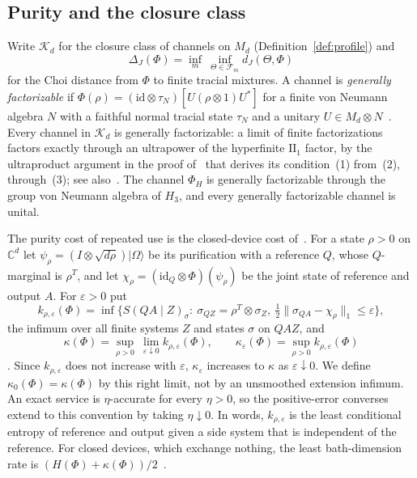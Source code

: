 \documentclass[11pt,a4paper]{article}
\theoremstyle{plain}
\theoremstyle{definition}
\theoremstyle{remark}
\newcommand{\dJ}{d_J}
\begin{document}
\subsection{Purity and the closure class}\label{sec:res-purity}


Write $\mathcal K_d$ for the closure class of channels on $M_d$ (Definition~\ref{def:profile}) and
\[
\Delta_J(\Phi)=\inf_m\ \inf_{\Theta\in\mathcal F_m}\dJ(\Theta,\Phi)
\]
for the Choi distance from $\Phi$ to finite tracial mixtures. A channel is \emph{generally factorizable} if
$\Phi(\rho)=(\mathrm{id}\otimes\tau_N)[U(\rho\otimes1)U^*]$ for a finite von Neumann algebra $N$ with a faithful normal tracial state
$\tau_N$ and a unitary $U\in M_d\otimes N$~\cite{AD2006,HaagerupMusat2011}. Every channel in $\mathcal K_d$ is generally
factorizable: a limit of finite factorizations factors exactly through an ultrapower of the hyperfinite $\mathrm{II}_1$ factor, by the
ultraproduct argument in the proof of~\cite[Theorem~3.6]{HaagerupMusat2015} that derives its condition~(1) from~(2), through~(3); see
also~\cite[Section~3]{Musat2025}. The channel $\Phi_H$ is generally factorizable through the group von Neumann algebra of $H_3$, and
every generally factorizable channel is unital.

The purity cost of repeated use is the closed-device cost of~\cite{Douglas2026closed}. For a state $\rho>0$ on $\mathbb C^d$ let
$\psi_\rho=(I\otimes\sqrt{d\rho})|\Omega\rangle$ be its purification with a reference $Q$, whose $Q$-marginal is $\rho^T$, and let
$\chi_\rho=(\mathrm{id}_Q\otimes\Phi)(\psi_\rho)$ be the joint state of reference and output $A$. For $\varepsilon>0$ put
\begin{equation}\label{eq:kappa-def}
k_{\rho,\varepsilon}(\Phi)=\inf\Big\{S(QA\mid Z)_\sigma:\ \sigma_{QZ}=\rho^T\otimes\sigma_Z,\ \tfrac12\|\sigma_{QA}-\chi_\rho\|_1\le\varepsilon\Big\},
\end{equation}
the infimum over all finite systems $Z$ and states $\sigma$ on $QAZ$, and
\[
\kappa(\Phi)=\sup_{\rho>0}\ \lim_{\varepsilon\downarrow0}k_{\rho,\varepsilon}(\Phi),\qquad
\kappa_\varepsilon(\Phi)=\sup_{\rho>0}k_{\rho,\varepsilon}(\Phi)
\]
\cite[Definition~1.3]{Douglas2026closed}. Since $k_{\rho,\varepsilon}$ does not increase with $\varepsilon$, $\kappa_\varepsilon$ increases to
$\kappa$ as $\varepsilon\downarrow0$. We define $\kappa_0(\Phi)=\kappa(\Phi)$ by this right limit, not by an unsmoothed extension infimum.
An exact service is $\eta$-accurate for every $\eta>0$, so the positive-error converses extend to this convention by taking $\eta\downarrow0$.
In words, $k_{\rho,\varepsilon}$ is the least conditional entropy of reference and output given a side
system that is independent of the reference. For closed devices, which exchange nothing, the least bath-dimension rate is
$(H(\Phi)+\kappa(\Phi))/2$~\cite[Theorem~2.1]{Douglas2026closed}.
\end{document}
